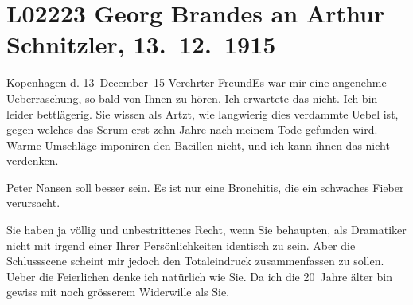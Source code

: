

\section[Georg Brandes an Arthur Schnitzler, 13. 12. 1915]{L02223 Georg Brandes an Arthur Schnitzler, 13. 12. 1915}
\nopagebreak{}
\rehead{ }\normalsize\beginnumbering{}
\toendnotes[C]{\smallbreak\pagebreak[2]}
\toendnotes[C]{\smallbreak}
\pstart
           \raggedleft{}{\pb}Kopenhagen d. 13 December 15\pend
           \vspace{0.5em}
\pstart
           Verehrter Freund\hspace*{1.5em}Es war mir eine angenehme Ueberraschung, so bald
               von Ihnen zu hören. Ich erwartete das nicht. Ich bin leider bettlägerig. Sie wissen
               als Artzt, wie langwierig dies verdammte Uebel ist, gegen welches das Serum erst zehn
               Jahre nach meinem Tode gefunden wird. Warme Umschläge imponiren den Bacillen nicht,
               und ich kann ihnen das nicht verdenken.\pend
           
\pstart
           Peter Nansen soll besser sein. Es ist nur eine
               Bronchitis, die ein schwaches Fieber verursacht.\pend
           
\pstart
           Sie haben ja völlig und unbestrittenes Recht, wenn Sie behaupten, als Dramatiker
               nicht mit irgend einer Ihrer Persönlichkeiten identisch zu sein. Aber die Schlussscene scheint mir jedoch
               den Totaleindruck zusammenfassen zu sollen. {\pb}Ueber die Feierlichen denke ich
               natürlich wie Sie. Da ich die 20 Jahre älter bin gewiss mit noch grösserem Widerwille
               als Sie.\pend
           

